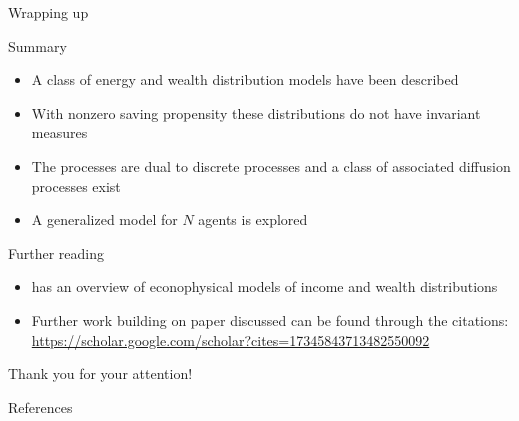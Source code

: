 \documentclass[9pt, handout]{beamer}
\begin{document}
\begin{frame}{Wrapping up}
  \begin{block}{Summary}
    \begin{itemize}
    \item A class of energy and wealth distribution models have been described
    \item With nonzero saving propensity these distributions do not have invariant measures
    \item The processes are dual to discrete processes and a class of associated diffusion processes exist
    \item A generalized model for $N$ agents is explored
    \end{itemize}
  \end{block}
  \begin{block}{Further reading}
    \begin{itemize}
    \item {} has an overview of econophysical models of income and wealth distributions
    \item Further work building on paper discussed can be found through the citations: \url{https://scholar.google.com/scholar?cites=17345843713482550092}
    \end{itemize}
  \end{block}
  \pause
  \begin{center}
  \huge{
  Thank you for your attention!
  }
  \end{center}
\end{frame}

\begin{frame}[allowframebreaks]{References}

%   
%   
  \printbibliography
\end{frame}
\end{document}
